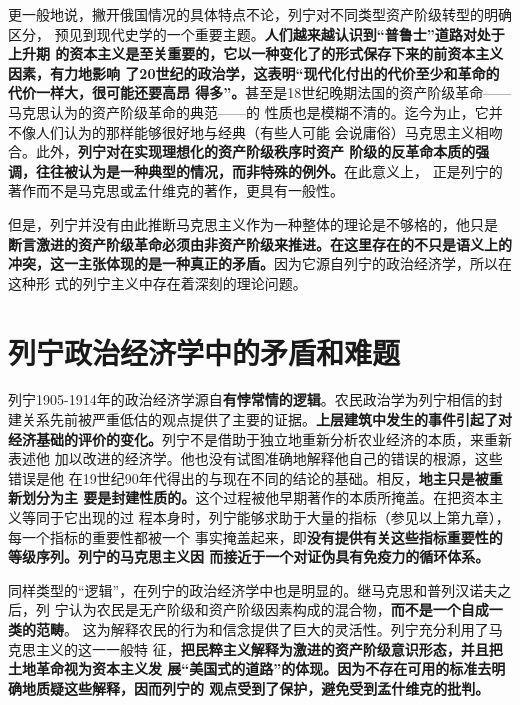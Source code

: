 更一般地说，撇开俄国情况的具体特点不论，列宁对不同类型资产阶级转型的明确区分，
预见到现代史学的一个重要主题。\textbf{人们越来越认识到“普鲁士”道路对处于上升期
的资本主义是至关重要的，它以一种变化了的形式保存下来的前资本主义因素，有力地影响
了20世纪的政治学，这表明“现代化付出的代价至少和革命的代价一样大，很可能还要高昂
得多”。}甚至是18世纪晚期法国的资产阶级革命——马克思认为的资产阶级革命的典范——的
性质也是模糊不清的。迄今为止，它并不像人们认为的那样能够很好地与经典（有些人可能
会说庸俗）马克思主义相吻合。此外，\textbf{列宁对在实现理想化的资产阶级秩序时资产
阶级的反革命本质的强调，往往被认为是一种典型的情况，而非特殊的例外。}在此意义上，
正是列宁的著作而不是马克思或孟什维克的著作，更具有一般性。

但是，列宁并没有由此推断马克思主义作为一种整体的理论是不够格的，他只是
\textbf{断言激进的资产阶级革命必须由非资产阶级来推进。在这里存在的不只是语义上的
冲突，这一主张体现的是一种真正的矛盾。}因为它源自列宁的政治经济学，所以在这种形
式的列宁主义中存在着深刻的理论问题。

\section{列宁政治经济学中的矛盾和难题}
列宁1905-1914年的政治经济学源自\textbf{有悖常情的逻辑}。农民政治学为列宁相信的封
建关系先前被严重低估的观点提供了主要的证据。\textbf{上层建筑中发生的事件引起了对
  经济基础的评价的变化。}列宁不是借助于独立地重新分析农业经济的本质，来重新表述他
加以改进的经济学。他也没有试图准确地解释他自己的错误的根源，这些错误是他
在19世纪90年代得出的与现在不同的结论的基础。相反，\textbf{地主只是被重新划分为主
  要是封建性质的。}这个过程被他早期著作的本质所掩盖。在把资本主义等同于它出现的过
程本身时，列宁能够求助于大量的指标（参见以上第九章），每一个指标的重要性都被一个
事实掩盖起来，即\textbf{没有提供有关这些指标重要性的等级序列。列宁的马克思主义因
  而接近于一个对证伪具有免疫力的循环体系。}

同样类型的“逻辑”，在列宁的政治经济学中也是明显的。继马克思和普列汉诺夫之后，列
宁认为农民是无产阶级和资产阶级因素构成的混合物，\textbf{而不是一个自成一类的范畴}。
这为解释农民的行为和信念提供了巨大的灵活性。列宁充分利用了马克思主义的这一一般特
征，\textbf{把民粹主义解释为激进的资产阶级意识形态，并且把土地革命视为资本主义发
  展“美国式的道路”的体现。因为不存在可用的标准去明确地质疑这些解释，因而列宁的
  观点受到了保护，避免受到孟什维克的批判。}

